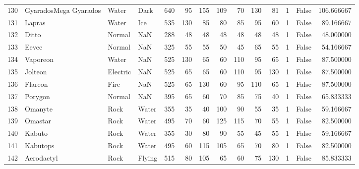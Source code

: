 \begin{tabular}{rlllrrrrrrrrlr}
 130 &      GyaradosMega Gyarados &     Water &      Dark &    640 &   95 &     155 &      109 &       70 &      130 &     81 &           1 &      False &  106.666667 \\
 131 &                     Lapras &     Water &       Ice &    535 &  130 &      85 &       80 &       85 &       95 &     60 &           1 &      False &   89.166667 \\
 132 &                      Ditto &    Normal &       NaN &    288 &   48 &      48 &       48 &       48 &       48 &     48 &           1 &      False &   48.000000 \\
 133 &                      Eevee &    Normal &       NaN &    325 &   55 &      55 &       50 &       45 &       65 &     55 &           1 &      False &   54.166667 \\
 134 &                   Vaporeon &     Water &       NaN &    525 &  130 &      65 &       60 &      110 &       95 &     65 &           1 &      False &   87.500000 \\
 135 &                    Jolteon &  Electric &       NaN &    525 &   65 &      65 &       60 &      110 &       95 &    130 &           1 &      False &   87.500000 \\
 136 &                    Flareon &      Fire &       NaN &    525 &   65 &     130 &       60 &       95 &      110 &     65 &           1 &      False &   87.500000 \\
 137 &                    Porygon &    Normal &       NaN &    395 &   65 &      60 &       70 &       85 &       75 &     40 &           1 &      False &   65.833333 \\
 138 &                    Omanyte &      Rock &     Water &    355 &   35 &      40 &      100 &       90 &       55 &     35 &           1 &      False &   59.166667 \\
 139 &                    Omastar &      Rock &     Water &    495 &   70 &      60 &      125 &      115 &       70 &     55 &           1 &      False &   82.500000 \\
 140 &                     Kabuto &      Rock &     Water &    355 &   30 &      80 &       90 &       55 &       45 &     55 &           1 &      False &   59.166667 \\
 141 &                   Kabutops &      Rock &     Water &    495 &   60 &     115 &      105 &       65 &       70 &     80 &           1 &      False &   82.500000 \\
 142 &                 Aerodactyl &      Rock &    Flying &    515 &   80 &     105 &       65 &       60 &       75 &    130 &           1 &      False &   85.833333 \\

\end{tabular}
